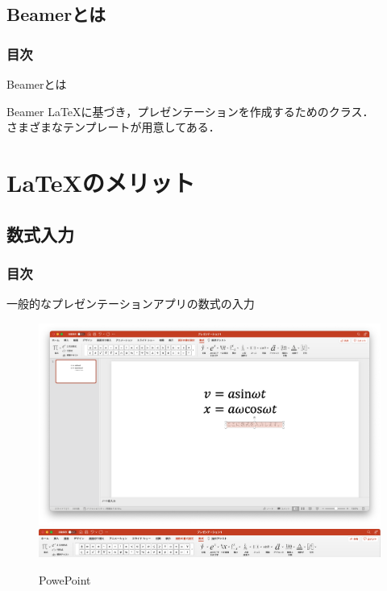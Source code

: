 \documentclass[dvipdfmx]{beamer}
\begin{document}
\subsection{Beamerとは}
\begin{frame}
    \frametitle{目次}
    \tableofcontents[currentsection,sectionstyle=show/shaded,subsectionstyle=show/shaded]
\end{frame}

\begin{frame}{Beamerとは}
    \begin{block}{Beamer}
        \LaTeX に基づき，プレゼンテーションを作成するためのクラス．\\
        さまざまなテンプレートが用意してある．
    \end{block}
\end{frame}

\section{\LaTeX のメリット}
\subsection{数式入力}
\begin{frame}
    \frametitle{目次}
    \tableofcontents[currentsection,sectionstyle=show/shaded,subsectionstyle=show/shaded]
\end{frame}

\begin{frame}{一般的なプレゼンテーションアプリの数式の入力}
    \begin{figure}[h]
        \centering
        \caption{PowePoint}
        \includegraphics[scale = 0.15]{PowePoint.png}
        \includegraphics[scale = 0.2]{PowePoint2.png}
    \end{figure}
\end{frame}
\end{document}
